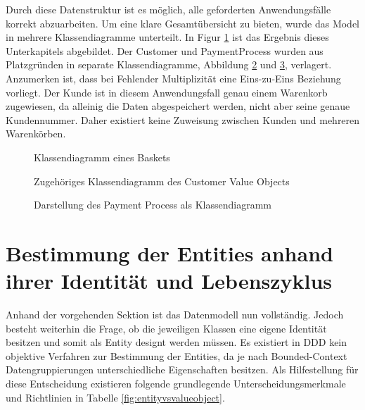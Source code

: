 
Durch diese Datenstruktur ist es möglich, alle geforderten Anwendungsfälle korrekt abzuarbeiten. Um eine klare Gesamtübersicht zu bieten, wurde das Model in mehrere Klassendiagramme unterteilt. In Figur \ref{fig:VO-Basket} ist das Ergebnis dieses Unterkapitels abgebildet. Der Customer und PaymentProcess wurden aus Platzgründen in separate Klassendiagramme, Abbildung \ref{fig:VO-Customer} und \ref{fig:VO-Payment}, verlagert. Anzumerken ist, dass bei Fehlender Multiplizität eine Eins-zu-Eins Beziehung vorliegt. Der Kunde ist in diesem Anwendungsfall genau einem Warenkorb zugewiesen, da alleinig die Daten abgespeichert werden, nicht aber seine genaue Kundennummer. Daher existiert keine Zuweisung zwischen Kunden und mehreren Warenkörben.

\begin{figure}[htbp]
	\centering
	
	\caption{Klassendiagramm eines Baskets}
	\label{fig:VO-Basket}
\end{figure}

\begin{figure}[htbp]
	\centering
	
	\caption{Zugehöriges Klassendiagramm des Customer Value Objects}
	\label{fig:VO-Customer}
\end{figure}

\begin{figure}[htbp]
	\centering
	
	\caption{Darstellung des Payment Process als Klassendiagramm}
	\label{fig:VO-Payment}
\end{figure}


\section{Bestimmung der Entities anhand ihrer Identität und Lebenszyklus}

Anhand der vorgehenden Sektion ist das Datenmodell nun vollständig. Jedoch besteht weiterhin die Frage, ob die jeweiligen Klassen eine eigene Identität besitzen und somit als Entity designt werden müssen. Es existiert in DDD kein objektive Verfahren zur Bestimmung der Entities, da je nach Bounded-Context Datengruppierungen unterschiedliche Eigenschaften besitzen. Als Hilfestellung für diese Entscheidung existieren folgende grundlegende Unterscheidungsmerkmale und Richtlinien in Tabelle \ref{fig:entityvsvalueobject}.

